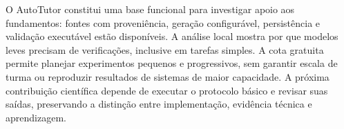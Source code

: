 \documentclass[12pt]{article}
\begin{document}
O AutoTutor constitui uma base funcional para investigar apoio aos fundamentos: fontes com proveniência, geração configurável, persistência e validação executável estão disponíveis. A análise local mostra por que modelos leves precisam de verificações, inclusive em tarefas simples. A cota gratuita permite planejar experimentos pequenos e progressivos, sem garantir escala de turma ou reproduzir resultados de sistemas de maior capacidade. A próxima contribuição científica depende de executar o protocolo básico e revisar suas saídas, preservando a distinção entre implementação, evidência técnica e aprendizagem.



\end{document}
